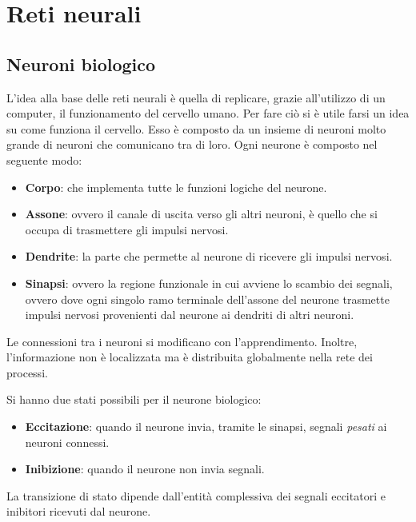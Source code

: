 \chapter{Reti neurali}
\section{Neuroni biologico}
L'idea alla base delle reti neurali è quella di replicare, grazie all'utilizzo di un computer, il funzionamento del cervello umano. Per fare ciò si è utile farsi un idea su come funziona il cervello. Esso è composto da un insieme di neuroni molto grande di neuroni che comunicano tra di loro. Ogni neurone è composto nel seguente modo:
\begin{itemize}
    \item \textbf{Corpo}: che implementa tutte le funzioni logiche del neurone.
    \item \textbf{Assone}: ovvero il canale di uscita verso gli altri neuroni, è quello che si occupa di trasmettere gli impulsi nervosi.
    \item \textbf{Dendrite}: la parte che permette al neurone di ricevere gli impulsi nervosi.
    \item \textbf{Sinapsi}: ovvero la regione funzionale in cui avviene lo scambio dei segnali, ovvero dove ogni singolo ramo terminale dell'assone del neurone trasmette impulsi nervosi provenienti dal neurone ai dendriti di altri neuroni.
\end{itemize}

Le connessioni tra i neuroni si modificano con l'apprendimento. Inoltre, l'informazione non è localizzata ma è distribuita globalmente nella rete dei processi.

Si hanno due stati possibili per il neurone biologico:
\begin{itemize}
    \item \textbf{Eccitazione}: quando il neurone invia, tramite le sinapsi, segnali \textit{pesati} ai neuroni connessi.
    \item \textbf{Inibizione}: quando il neurone non invia segnali.
\end{itemize}

La transizione di stato dipende dall'entità complessiva dei segnali eccitatori e inibitori ricevuti dal neurone.
